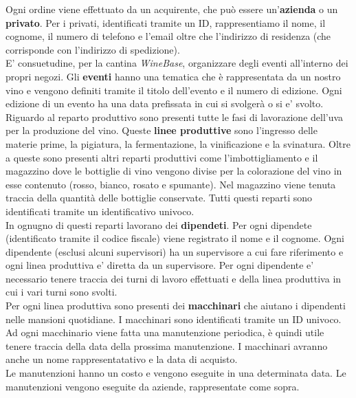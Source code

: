 Ogni ordine viene effettuato da un acquirente, che può essere un'\textbf{azienda} o un \textbf{privato}. Per i privati, identificati tramite un ID, rappresentiamo il nome, il cognome, il numero di telefono e l'email oltre che l'indirizzo di residenza (che corrisponde con l'indirizzo di spedizione).\\
E' consuetudine, per la cantina \emph{WineBase}, organizzare degli eventi all'interno dei propri negozi. Gli \textbf{eventi} hanno una tematica che è rappresentata da un nostro vino e vengono definiti tramite il titolo dell'evento e il numero di edizione. Ogni edizione di un evento ha una data prefissata in cui si svolgerà o si e' svolto.
Riguardo al reparto produttivo sono presenti tutte le fasi di lavorazione dell'uva per la produzione del vino. Queste \textbf{linee produttive} sono l'ingresso delle materie prime, la pigiatura, la fermentazione, la vinificazione e la svinatura. Oltre a queste sono presenti altri reparti produttivi come l'imbottigliamento e il magazzino dove le bottiglie di vino vengono divise per la colorazione del vino in esse contenuto (rosso, bianco, rosato e spumante). Nel magazzino viene tenuta traccia della quantità delle bottiglie conservate. Tutti questi reparti sono identificati tramite un identificativo univoco.\\
In ognugno di questi reparti lavorano dei \textbf{dipendeti}. Per ogni dipendete (identificato tramite il codice fiscale) viene registrato il nome e il cognome. Ogni dipendente (esclusi alcuni supervisori) ha un supervisore a cui fare riferimento e ogni linea produttiva e' diretta da un supervisore. Per ogni dipendente e' necessario tenere traccia dei turni di lavoro effettuati e della linea produttiva in cui i vari turni sono svolti.\\
Per ogni linea produttiva sono presenti dei \textbf{macchinari} che aiutano i dipendenti nelle mansioni quotidiane. I macchinari sono identificati tramite un ID univoco. Ad ogni macchinario viene fatta una manutenzione periodica, è quindi utile tenere traccia della data della prossima manutenzione. I macchinari avranno anche un nome rappresentatativo e la data di acquisto.\\
Le manutenzioni hanno un costo e vengono eseguite in una determinata data. Le manutenzioni vengono eseguite da aziende, rappresentate come sopra.